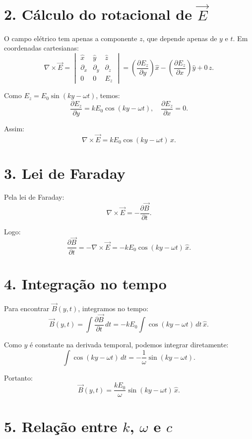 \documentclass[a4paper,12pt]{article}
\begin{document}
\begin{flushleft}
\section*{2. Cálculo do rotacional de \(\vec{E}\)}

O campo elétrico tem apenas a componente \(z\), que depende apenas de \(y\) e \(t\).  
Em coordenadas cartesianas:
\[
\nabla \times \vec{E} =
\begin{vmatrix}
\hat{x} & \hat{y} & \hat{z} \\[4pt]
\partial_x & \partial_y & \partial_z \\[4pt]
0 & 0 & E_z
\end{vmatrix}
=
\left( \frac{\partial E_z}{\partial y} \right) \hat{x} - \left( \frac{\partial E_z}{\partial x} \right) \hat{y} + 0 \, \hat{z}.
\]

Como \(E_z = E_0 \sin(k y - \omega t)\), temos:
\[
\frac{\partial E_z}{\partial y} = k E_0 \cos(k y - \omega t),
\quad
\frac{\partial E_z}{\partial x} = 0.
\]

Assim:
\[
\nabla \times \vec{E} = k E_0 \cos(k y - \omega t) \, \hat{x}.
\]

\section*{3. Lei de Faraday}

Pela lei de Faraday:
\[
\nabla \times \vec{E} = -\frac{\partial \vec{B}}{\partial t}.
\]

Logo:
\[
\frac{\partial \vec{B}}{\partial t} = -\nabla \times \vec{E} = -k E_0 \cos(k y - \omega t) \, \hat{x}.
\]

\section*{4. Integração no tempo}

Para encontrar \(\vec{B}(y,t)\), integramos no tempo:
\[
\vec{B}(y,t) = \int \frac{\partial \vec{B}}{\partial t} \, dt = -k E_0 \int \cos(k y - \omega t) \, dt \, \hat{x}.
\]

Como \(y\) é constante na derivada temporal, podemos integrar diretamente:
\[
\int \cos(k y - \omega t) \, dt = -\frac{1}{\omega} \sin(k y - \omega t).
\]

Portanto:
\[
\vec{B}(y,t) = \frac{k E_0}{\omega} \sin(k y - \omega t) \, \hat{x}.
\]

\section*{5. Relação entre \(k\), \(\omega\) e \(c\)}


\end{flushleft}
\end{document}
